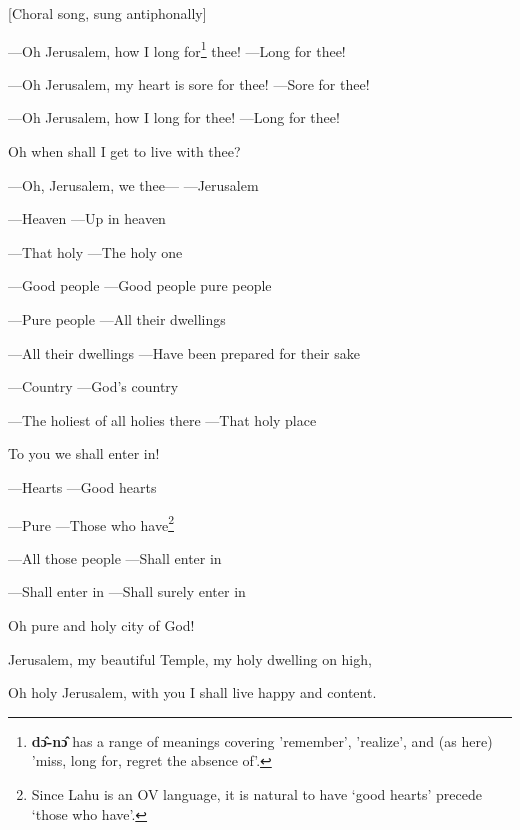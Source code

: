 \setcounter{footnote}{0}

[Choral song, sung antiphonally]

---Oh Jerusalem, how I long for\footnote{\textbf{dɔ̂-nɔ̂} has a range of meanings covering 'remember', 'realize', and (as here) 'miss, long for, regret the absence of'.} thee! ---Long for thee!

---Oh Jerusalem, my heart is sore for thee! ---Sore for thee!

---Oh Jerusalem, how I long for thee! ---Long for thee!

Oh when shall I get to live with thee?

---Oh, Jerusalem, we thee--- ---Jerusalem

---Heaven ---Up in heaven

---That holy ---The holy one

---Good people ---Good people pure people

---Pure people ---All their dwellings

---All their dwellings ---Have been prepared for their sake

---Country ---God's country

---The holiest of all holies there ---That holy place

To you we shall enter in!

---Hearts ---Good hearts

---Pure ---Those who have\footnote{Since Lahu is an OV language, it is natural to have `good hearts' precede `those who have'.}

---All those people ---Shall enter in

---Shall enter in ---Shall surely enter in

Oh pure and holy city of God!

Jerusalem, my beautiful Temple, my holy dwelling on high,

Oh holy Jerusalem, with you I shall live happy and content.


